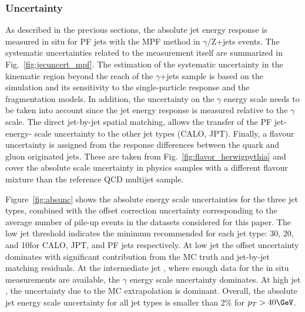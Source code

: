 \subsubsection{Uncertainty}

As described in the previous sections, the absolute jet energy response is measured in situ for PF jets with the MPF method in $\gamma$/Z+jets events. The systematic uncertainties related to the measurement itself are summarized in Fig.~\ref{fig:jecuncert_mpf}. The estimation of the systematic uncertainty in the kinematic region beyond the reach of the $\gamma$+jets sample is based on the simulation and its sensitivity to the single-particle response and the fragmentation models. In addition, the uncertainty on the $\gamma$ energy scale needs to be taken into account since the jet energy response is measured relative to the $\gamma$ scale. The direct jet-by-jet spatial matching, allows the transfer of the PF jet-energy- scale uncertainty to the other jet types (CALO, JPT). Finally, a flavour uncertainty is assigned from the response differences between the quark and gluon originated jets. These are taken from Fig.~\ref{fig:flavor_herwigpythia} and cover the absolute scale uncertainty in physics samples with a different flavour mixture than the reference QCD multijet sample. 

Figure~\ref{fig:absunc} shows the absolute energy scale uncertainties for the three jet types, combined with the offset correction uncertainty corresponding to the average number of pile-up events in the datasets considered for this paper. The low jet \pt threshold indicates the minimum recommended \pt for each jet type: 30\GeV, 20\GeV, and 10\GeV for CALO, JPT, and PF jets respectively. At low jet \pt the offset uncertainty dominates with significant contribution from the MC truth and jet-by-jet matching residuals. At the intermediate jet \pt, where enough data for the in situ measurements are available, the $\gamma$ energy scale uncertainty dominates. At high jet \pt, the uncertainty due to the MC extrapolation is dominant. Overall, the absolute jet energy scale uncertainty for all jet types is smaller than 2\% for $\pt>40\GeV$. 

